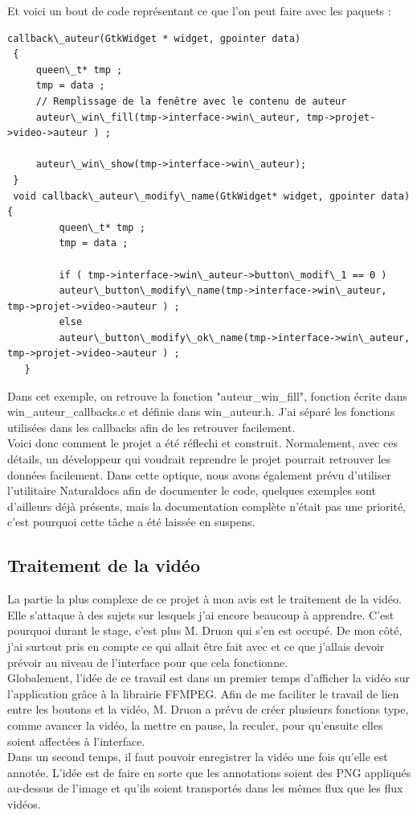 \documentclass[11pt,french,a4paper]{report}
\begin{document}
Et voici un bout de code représentant ce que l'on peut faire avec les paquets : 
\begin{lstlisting}
callback\_auteur(GtkWidget * widget, gpointer data)
 {
     queen\_t* tmp ;
     tmp = data ;
     // Remplissage de la fenêtre avec le contenu de auteur
     auteur\_win\_fill(tmp->interface->win\_auteur, tmp->projet->video->auteur ) ;

     auteur\_win\_show(tmp->interface->win\_auteur);
 }
 void callback\_auteur\_modify\_name(GtkWidget* widget, gpointer data) {
         queen\_t* tmp ;
         tmp = data ;

         if ( tmp->interface->win\_auteur->button\_modif\_1 == 0 )
         auteur\_button\_modify\_name(tmp->interface->win\_auteur, tmp->projet->video->auteur ) ;
         else
         auteur\_button\_modify\_ok\_name(tmp->interface->win\_auteur, tmp->projet->video->auteur ) ;
   }
\end{lstlisting}
Dans cet exemple, on retrouve la fonction "auteur\_win\_fill", fonction écrite dans win\_auteur\_callbacks.c et définie
dans win\_auteur.h. J'ai séparé les fonctions utilisées dans les callbacks afin de les retrouver facilement. \\
Voici donc comment le projet a été réflechi et construit. Normalement, avec ces détails, un développeur qui voudrait reprendre
le projet pourrait retrouver les données facilement. Dans cette optique, nous avons également prévu d'utiliser  %
l'utilitaire Naturaldocs afin de documenter le code, quelques exemples sont d'ailleurs déjà présents, mais la documentation 
complète n'était pas une priorité, c'est pourquoi cette tâche a été laissée en suspens. 
       
        \subsection{Traitement de la vidéo}
La partie la plus complexe de ce projet à mon avis est le traitement de la vidéo. Elle s'attaque à des sujets sur lesquels j'ai 
encore beaucoup à apprendre. C'est pourquoi durant le stage, c'est plus M. Druon qui s'en est occupé. De mon côté, j'ai surtout
pris en compte ce qui allait être fait avec et ce que j'allais devoir prévoir au niveau de l'interface pour que cela fonctionne. \\
Globalement, l'idée de ce travail est dans un premier temps d'afficher la vidéo sur l'application grâce à 
la librairie FFMPEG. Afin de me faciliter
le travail de lien entre les boutons et la vidéo, M. Druon a prévu de créer plusieurs fonctions type, comme avancer la vidéo, la 
mettre en pause, la reculer, pour qu'ensuite elles soient affectées à l'interface. \\
Dans un second temps, il faut pouvoir enregistrer la vidéo une fois qu'elle est annotée. L'idée est de faire en sorte que les annotations
soient des PNG appliqués au-dessus de l'image et qu'ils soient transportés dans les mêmes flux que les flux vidéos. \\
\end{document}
